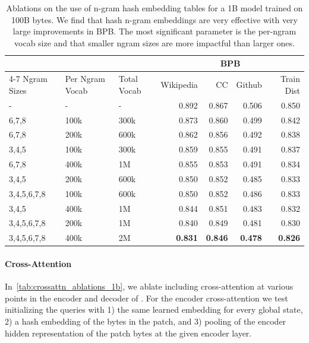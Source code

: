 \documentclass[]{fairmeta}
\begin{document}
\begin{table}[th]
\centering
\begin{tabular}{@{}lllrrrr@{}}
\toprule
 & & &  \multicolumn{4}{c}{BPB} \\
\cmidrule(lr){4-7} 
Ngram Sizes & Per Ngram Vocab & Total Vocab &  Wikipedia &    CC &  Github &  Train Dist \\
\midrule
               - &       - &        - &    0.892 & 0.867 &   0.506 &       0.850 \\
           6,7,8 &      100k &   300k &    0.873 & 0.860 &   0.499 &       0.842 \\
           6,7,8 &      200k &   600k &    0.862 & 0.856 &   0.492 &       0.838 \\
           3,4,5 &      100k &   300k &    0.859 & 0.855 &   0.491 &       0.837 \\
           6,7,8 &      400k &     1M &    0.855 & 0.853 &   0.491 &       0.834 \\
           3,4,5 &      200k &   600k &    0.850 & 0.852 &   0.485 &       0.833 \\
     3,4,5,6,7,8 &      100k &   600k &    0.850 & 0.852 &   0.486 &       0.833 \\
           3,4,5 &      400k &     1M &    0.844 & 0.851 &   0.483 &       0.832 \\
     3,4,5,6,7,8 &      200k &     1M &    0.840 & 0.849 &   0.481 &       0.830 \\
     3,4,5,6,7,8 &      400k &     2M &    \textbf{0.831} & \textbf{0.846} &   \textbf{0.478} &       \textbf{0.826} \\
\bottomrule
\end{tabular}
\caption{Ablations on the use of n-gram hash embedding tables for a 1B \model{} model trained on 100B bytes. We find that hash n-gram embeddings are very effective with very large improvements in BPB.
The most significant parameter is the per-ngram vocab size and that smaller ngram sizes are more impactful than larger ones.
}
\label{tab:ngram_ablations_1b}
\end{table}

\paragraph{Cross-Attention} 
In~\autoref{tab:crossattn_ablations_1b}, we ablate including cross-attention at various points in the encoder and decoder of \model{}. 
For the encoder cross-attention we test initializing the queries with 1) the same learned embedding for every global state, 2) a hash embedding of the bytes in the patch, and 3) pooling of the encoder hidden representation of the patch bytes at the given encoder layer.
\end{document}
